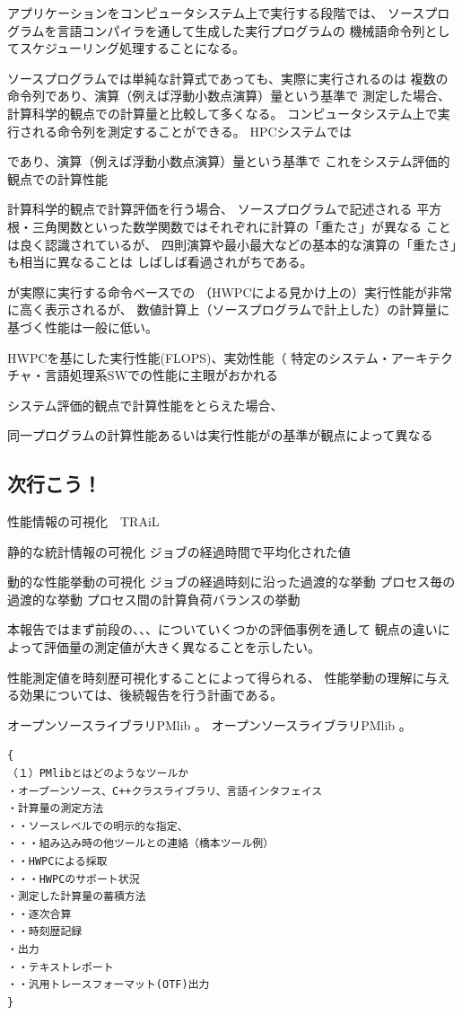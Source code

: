 \documentclass[submit,techrep,noauthor]{ipsj}
\begin{document}
アプリケーションをコンピュータシステム上で実行する段階では、
ソースプログラムを言語コンパイラを通して生成した実行プログラムの
機械語命令列としてスケジューリング処理することになる。

ソースプログラムでは単純な計算式であっても、実際に実行されるのは
複数の命令列であり、演算（例えば浮動小数点演算）量という基準で
測定した場合、計算科学的観点での計算量と比較して多くなる。
コンピュータシステム上で実行される命令列を測定することができる。
HPCシステムでは

であり、演算（例えば浮動小数点演算）量という基準で
これをシステム評価的観点での計算性能

計算科学的観点で計算評価を行う場合、
ソースプログラムで記述される
平方根・三角関数といった数学関数ではそれぞれに計算の「重たさ」が異なる
ことは良く認識されているが、
四則演算や最小最大などの基本的な演算の「重たさ」も相当に異なることは
しばしば看過されがちである。

が実際に実行する命令ベースでの
（HWPCによる見かけ上の）実行性能が非常に高く表示されるが、
数値計算上（ソースプログラムで計上した）の計算量に基づく性能は一般に低い。

HWPCを基にした実行性能(FLOPS)、実効性能（%
特定のシステム・アーキテクチャ・言語処理系SWでの性能に主眼がおかれる

システム評価的観点で計算性能をとらえた場合、

同一プログラムの計算性能あるいは実行性能がの基準が観点によって異なる



\subsection {次行こう！}

性能情報の可視化　TRAiL

静的な統計情報の可視化
ジョブの経過時間で平均化された値

動的な性能挙動の可視化
ジョブの経過時刻に沿った過渡的な挙動
プロセス毎の過渡的な挙動
プロセス間の計算負荷バランスの挙動

本報告ではまず前段の、、、についていくつかの評価事例を通して
観点の違いによって評価量の測定値が大きく異なることを示したい。

性能測定値を時刻歴可視化することによって得られる、
性能挙動の理解に与える効果については、後続報告を行う計画である。

オープンソースライブラリPMlib \cite{PMlib1:webpage}。
オープンソースライブラリPMlib \cite{PMlib2:webpage}。

\begin{verbatim}
{
（１）PMlibとはどのようなツールか
・オープーンソース、C++クラスライブラリ、言語インタフェイス
・計算量の測定方法
・・ソースレベルでの明示的な指定、
・・・組み込み時の他ツールとの連絡（橋本ツール例）
・・HWPCによる採取
・・・HWPCのサポート状況
・測定した計算量の蓄積方法
・・逐次合算
・・時刻歴記録
・出力
・・テキストレポート
・・汎用トレースフォーマット(OTF)出力
}
\end{verbatim}
\end{document}
